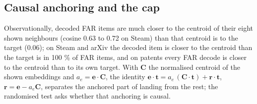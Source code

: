 \documentclass[
  10pt,
]{article}
\begin{document}
\subsection{Causal anchoring and the cap}\label{app:A.3}

Observationally, decoded FAR items are
much closer to the centroid of their
eight shown neighbours (cosine 0.63 to
0.72 on Steam) than that centroid is to
the target (0.06); on Steam and arXiv
the decoded item is closer to the
centroid than the target is in 100 \% of
FAR items, and on patents every FAR
decode is closer to the centroid than to
its own target. With \(\mathbf{C}\) the
normalised centroid of the shown
embeddings and
\(a_e = \mathbf{e} \cdot \mathbf{C}\),
the identity
\(\mathbf{e} \cdot \mathbf{t} = a_e\,(\mathbf{C} \cdot \mathbf{t}) + \mathbf{r} \cdot \mathbf{t}\),
\(\mathbf{r} = \mathbf{e} - a_e \mathbf{C}\),
separates the anchored part of landing
from the rest; the randomised test asks
whether that anchoring is causal.
\end{document}
